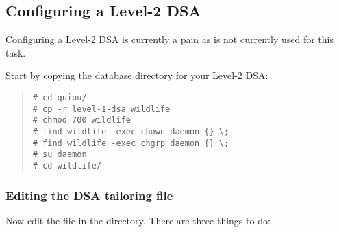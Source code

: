 \subsection	{Configuring a Level-2 DSA}
Configuring a Level-2 DSA is currently a pain as  is not
currently used for this task.

Start by copying the database directory for your Level-2 DSA:
\begin{quote}\small\begin{verbatim}
# cd quipu/
# cp -r level-1-dsa wildlife
# chmod 700 wildlife
# find wildlife -exec chown daemon {} \;
# find wildlife -exec chgrp daemon {} \;
# su daemon
# cd wildlife/
\end{verbatim}\end{quote}

\subsubsection	{Editing the DSA tailoring file}
Now edit the  file in the  directory.
There are three things to do:
